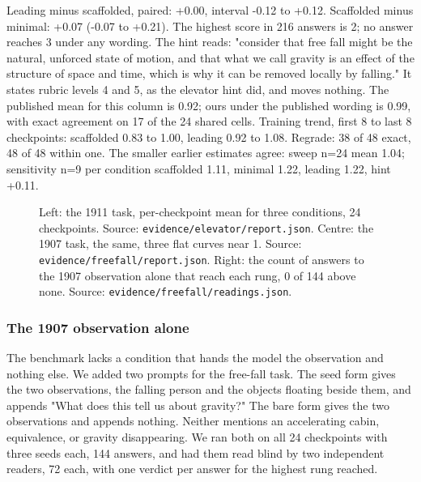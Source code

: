 \documentclass[reprint,prx,amsmath,amssymb,aps,superscriptaddress]{revtex4-2}
\begin{document}
Leading minus scaffolded, paired: +0.00, interval -0.12 to +0.12. Scaffolded minus minimal: +0.07 (-0.07 to +0.21). The highest score in 216 answers is 2; no answer reaches 3 under any wording. The hint reads: "consider that free fall might be the natural, unforced state of motion, and that what we call gravity is an effect of the structure of space and time, which is why it can be removed locally by falling." It states rubric levels 4 and 5, as the elevator hint did, and moves nothing. The published mean for this column is 0.92; ours under the published wording is 0.99, with exact agreement on 17 of the 24 shared cells. Training trend, first 8 to last 8 checkpoints: scaffolded 0.83 to 1.00, leading 0.92 to 1.08. Regrade: 38 of 48 exact, 48 of 48 within one. The smaller earlier estimates agree: sweep n=24 mean 1.04; sensitivity n=9 per condition scaffolded 1.11, minimal 1.22, leading 1.22, hint +0.11.

\begin{figure}[t]
\centering
{}
\caption{Left: the 1911 task, per-checkpoint mean for three conditions, 24 checkpoints. Source: \texttt{evidence/elevator/report.json}. Centre: the 1907 task, the same, three flat curves near 1. Source: \texttt{evidence/freefall/report.json}. Right: the count of answers to the 1907 observation alone that reach each rung, 0 of 144 above none. Source: \texttt{evidence/freefall/readings.json}.}
\label{fig:5}
\end{figure}

\subsubsection{The 1907 observation alone}

The benchmark lacks a condition that hands the model the observation and nothing else. We added two prompts for the free-fall task. The seed form gives the two observations, the falling person and the objects floating beside them, and appends "What does this tell us about gravity?" The bare form gives the two observations and appends nothing. Neither mentions an accelerating cabin, equivalence, or gravity disappearing. We ran both on all 24 checkpoints with three seeds each, 144 answers, and had them read blind by two independent readers, 72 each, with one verdict per answer for the highest rung reached.
\end{document}
